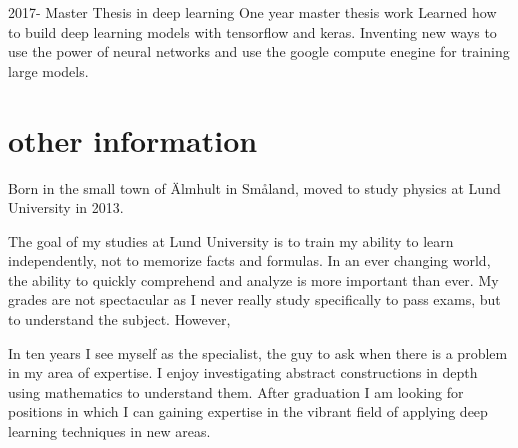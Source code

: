 \documentclass[]{twentysecondcv}
\begin{document}
\begin{twenty}
  \twentyitem
      {2017-}
      {Master Thesis in deep learning}
      {One year master thesis work}
      {Learned how to build deep learning models with
        tensorflow and keras. Inventing new ways to use the power of
        neural networks and use the google compute enegine for
        training large models.}
\end{twenty}

\section{other information}
Born in the small town of \"Almhult in Sm\aa land, moved to study
physics at Lund University in 2013.

The goal of my studies at Lund University is to train my ability to
learn independently, not to memorize facts and formulas. In an ever
changing world, the ability to quickly comprehend and analyze is more
important than ever. My grades are not spectacular as I never really
study specifically to pass exams, but to understand the
subject. However,

In ten years I see myself as the specialist, the guy to ask when there
is a problem in my area of expertise. I enjoy investigating abstract
constructions in depth using mathematics to understand them. After
graduation I am looking for positions in which I can gaining expertise
in the vibrant field of applying deep learning techniques in new areas.

\end{document}
